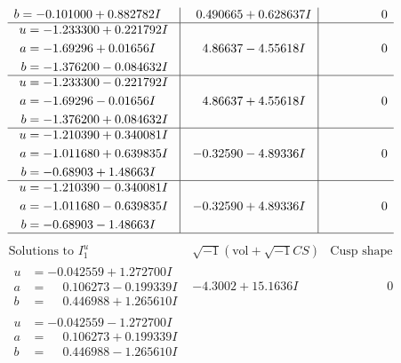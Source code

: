 \documentclass[1p]{elsarticle_modified}
\theoremstyle{definition}
\newcommand{\I}{\sqrt{-1}}
\begin{document}
$$\begin{array}{c|c|c}
\begin{aligned}
b &= -0.101000 + 0.882782 I\end{aligned}
 & \phantom{-}0.490665 + 0.628637 I & \phantom{-0.000000 } 0 \\ \hline\begin{aligned}
u &= -1.233300 + 0.221792 I \\
a &= -1.69296 + 0.01656 I \\
b &= -1.376200 - 0.084632 I\end{aligned}
 & \phantom{-}4.86637 - 4.55618 I & \phantom{-0.000000 } 0 \\ \hline\begin{aligned}
u &= -1.233300 - 0.221792 I \\
a &= -1.69296 - 0.01656 I \\
b &= -1.376200 + 0.084632 I\end{aligned}
 & \phantom{-}4.86637 + 4.55618 I & \phantom{-0.000000 } 0 \\ \hline\begin{aligned}
u &= -1.210390 + 0.340081 I \\
a &= -1.011680 + 0.639835 I \\
b &= -0.68903 + 1.48663 I\end{aligned}
 & -0.32590 - 4.89336 I & \phantom{-0.000000 } 0 \\ \hline\begin{aligned}
u &= -1.210390 - 0.340081 I \\
a &= -1.011680 - 0.639835 I \\
b &= -0.68903 - 1.48663 I\end{aligned}
 & -0.32590 + 4.89336 I & \phantom{-0.000000 } 0\\
 \hline 
 \end{array}$$\newpage$$\begin{array}{c|c|c}  
\text{Solutions to }I^u_{1}& \I (\text{vol} + \sqrt{-1}CS) & \text{Cusp shape}\\
 \hline 
\begin{aligned}
u &= -0.042559 + 1.272700 I \\
a &= \phantom{-}0.106273 - 0.199339 I \\
b &= \phantom{-}0.446988 + 1.265610 I\end{aligned}
 & -4.3002 + 15.1636 I & \phantom{-0.000000 } 0 \\ \hline\begin{aligned}
u &= -0.042559 - 1.272700 I \\
a &= \phantom{-}0.106273 + 0.199339 I \\
b &= \phantom{-}0.446988 - 1.265610 I\end{aligned}

\end{array}$$
\end{document}
